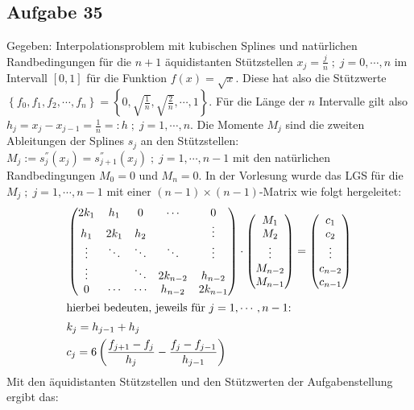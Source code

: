 \subsection*{Aufgabe 35}
Gegeben: Interpolationsproblem mit kubischen Splines und natürlichen Randbedingungen für
die $n + 1$ äquidistanten Stützstellen
$x_j = \frac{j}{n}\; ;\; j = 0, \cdots , n$ im Intervall $[0,1]$ für die Funktion
$f(x) = \sqrt{x}$. Diese hat also die Stützwerte $\left\lbrace f_0, f_1, f_2 , \cdots , f_n \right\rbrace = \left\lbrace 0, \sqrt{\frac{1}{n}}, \sqrt{\frac{2}{n}} , \cdots , 1\right\rbrace$.
Für die Länge der $n$ Intervalle gilt also
$h_j = x_j - x_{j-1} = \frac{1}{n} =: h \; ;\; j = 1, \cdots , n$.
Die Momente $M_j$ sind die zweiten Ableitungen der Splines $s_j$ an den Stützstellen:
$M_j := s_j^{''}(x_j) = s_{j+1}^{''}(x_j) \; ;\; j = 1, \cdots , n-1$ mit den natürlichen
Randbedingungen $M_0 = 0$ und $M_n = 0$.
In der Vorlesung wurde das LGS für die $M_j\; ;\; j = 1, \cdots , n-1$
mit einer $(n-1)\times(n-1)$-Matrix wie folgt hergeleitet:
\begin{align}
 & \begin{pmatrix}
 \label{eq-spline}
   2k_1&h_1& 0 &\cdots&0\\
   h_1&2k_1&h_2& & \vdots\\
  \vdots & \ddots &\ddots&\ddots&\vdots\\
   \vdots & &\ddots&2k_{n-2}&h_{n-2}\\
  0 & \cdots &\cdots&h_{n-2}&2k_{n-1}
  \end{pmatrix} \cdot
  \begin{pmatrix}M_1\\M_2 \\ \vdots \\M_{n-2} \\M_{n-1}\end{pmatrix} =
  \begin{pmatrix}c_1\\c_2 \\ \vdots \\c_{n-2} \\c_{n-1}\end{pmatrix} \\
\intertext{hierbei bedeuten, jeweils für $j = 1, \cdots , n-1$:}
\nonumber
& k_j = h_{j-1} + h_j\\
\nonumber
& c_j = 6 \left(\frac{f_{j+1}- f_j}{h_j} - \frac{f_{j}- f_{j-1}}{h_{j-1}} \right)
\end{align}
Mit den äquidistanten Stützstellen und den Stützwerten der Aufgabenstellung ergibt das:

